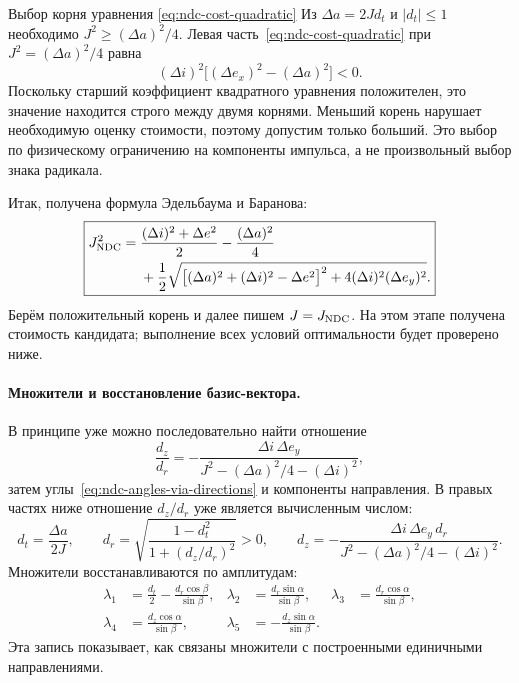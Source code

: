 \begin{explanation}{Выбор корня уравнения \eqref{eq:ndc-cost-quadratic}}
Из $\Delta a=2Jd_t$ и $|d_t|\leq1$ необходимо
$J^2\geq(\Delta a)^2/4$.
Левая часть~\eqref{eq:ndc-cost-quadratic} при
$J^2=(\Delta a)^2/4$ равна
\[
 (\Delta i)^2\bigl[(\Delta e_x)^2-(\Delta a)^2\bigr]<0.
\]
Поскольку старший коэффициент квадратного уравнения положителен,
это значение находится строго между двумя корнями.
Меньший корень нарушает необходимую оценку стоимости, поэтому
допустим только больший. Это выбор по физическому ограничению
на компоненты импульса, а не произвольный выбор знака радикала.
\end{explanation}

Итак, получена формула Эдельбаума и Баранова:
\begin{equation}
 \boxed{\begin{aligned}
 J_{\rm NDC}^2={}&\frac{(\Delta i)^2+\Delta e^2}{2}-\frac{(\Delta a)^2}{4}\\
 &+\frac12\sqrt{\bigl[(\Delta a)^2+(\Delta i)^2-\Delta e^2\bigr]^2
                         +4(\Delta i)^2(\Delta e_y)^2}.
 \end{aligned}}
 \label{eq:ndc-cost}
\end{equation}
Берём положительный корень и далее пишем $J=J_{\rm NDC}$.
На этом этапе получена стоимость кандидата; выполнение всех
условий оптимальности будет проверено ниже.

\paragraph{Множители и восстановление базис-вектора.}
В принципе уже можно последовательно найти отношение
\[
 \frac{d_z}{d_r}=-\frac{\Delta i\,\Delta e_y}
 {J^2-(\Delta a)^2/4-(\Delta i)^2},
\]
затем углы~\eqref{eq:ndc-angles-via-directions} и компоненты
направления. В правых частях ниже отношение $d_z/d_r$ уже
является вычисленным числом:
\[
 d_t=\frac{\Delta a}{2J},\qquad
 d_r=\sqrt{\frac{1-d_t^2}{1+(d_z/d_r)^2}}>0,
 \qquad d_z=-\frac{\Delta i\,\Delta e_y\,d_r}
 {J^2-(\Delta a)^2/4-(\Delta i)^2}.
\]
Множители восстанавливаются по амплитудам:
\begin{equation}
\begin{aligned}
 \lambda_1&=\frac{d_t}{2}-\frac{d_r\cos\beta}{\sin\beta},&
 \lambda_2&=\frac{d_r\sin\alpha}{\sin\beta},&
 \lambda_3&=\frac{d_r\cos\alpha}{\sin\beta},\\
 \lambda_4&=\frac{d_z\cos\alpha}{\sin\beta},&
 \lambda_5&=-\frac{d_z\sin\alpha}{\sin\beta}.&&
\end{aligned}
\label{eq:ndc-reconstruct-multipliers}
\end{equation}
Эта запись показывает, как связаны множители с построенными
единичными направлениями.

